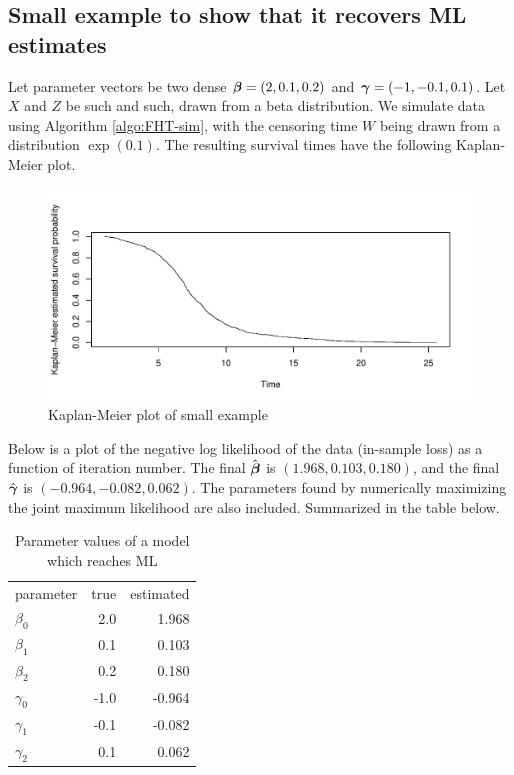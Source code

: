 \subsection{Small example to show that it recovers ML estimates}
Let parameter vectors be two dense $\boldsymbol{\beta}=(2,0.1,0.2)$ and $\boldsymbol{\gamma}=(-1, -0.1, 0.1)$. Let $X$ and $Z$ be such and such, drawn from a beta distribution.
We simulate data using Algorithm \ref{algo:FHT-sim}, with the censoring time $W$ being drawn from a distribution $\exp(0.1)$. The resulting survival times have the following Kaplan-Meier plot.
\begin{figure}
\caption{Kaplan-Meier plot of small example}
\centering\includegraphics[scale=0.4]{figures/case1.pdf}
\end{figure}
Below is a plot of the negative log likelihood of the data (in-sample loss) as a function of iteration number.
The final $\hat{\boldsymbol{\beta}}$ is $(1.968, 0.103, 0.180)$, and the final $\hat{\boldsymbol{\gamma}}$ is $(-0.964, -0.082, 0.062)$. The parameters found by numerically maximizing the joint maximum likelihood are also included. Summarized in the table below.

\begin{table}\caption{Parameter values of a model which reaches ML}\label{table:ML}
\begin{tabular}{lrr}
    parameter  & true & estimated \\
    $\beta_0$  &  2.0 &     1.968 \\
    $\beta_1$  &  0.1 &     0.103 \\
    $\beta_2$  &  0.2 &     0.180 \\
    $\gamma_0$ & -1.0 &    -0.964 \\
    $\gamma_1$ & -0.1 &    -0.082 \\
    $\gamma_2$ &  0.1 &     0.062 \\
\end{tabular}
\end{table}

